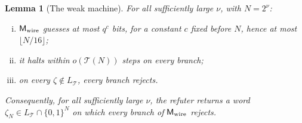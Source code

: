 \documentclass[11pt,letterpaper]{article}
\newtheorem{lemma}[theorem]{Lemma}
\theoremstyle{definition}
\theoremstyle{remark}
\newcommand{\Tclk}{\mathcal T}
\begin{document}
\begin{lemma}[The weak machine]\label{lem:ae-machine}
For all sufficiently large \(\nu\), with \(N=2^\nu\):
\begin{enumerate}[(i)]
\item \(\mathsf M_{\rm wire}\) guesses at most \(q^{c}\) bits, for a
constant \(c\) fixed before \(N\), hence at most \(\lfloor N/16\rfloor\);
\item it halts within \(o(\Tclk(N))\) steps on every branch;
\item on every \(\zeta\notin L_{\Tclk}\), every branch rejects.
\end{enumerate}
Consequently, for all sufficiently large \(\nu\), the refuter returns
a word \(\zeta_N\in L_{\Tclk}\cap\{0,1\}^N\) on which every branch
of \(\mathsf M_{\rm wire}\) rejects.
\end{lemma}
\end{document}
